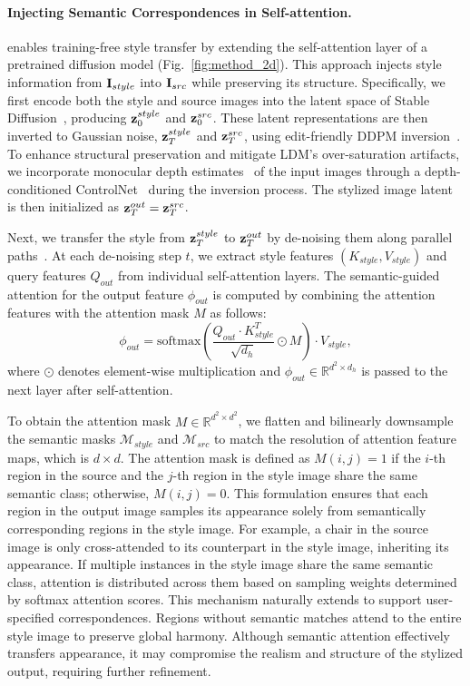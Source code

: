\paragraph{Injecting Semantic Correspondences in Self-attention.}
\ours enables training-free style transfer by extending the self-attention layer of a pretrained diffusion model (Fig.~\ref{fig:method_2d}). This approach injects style information from $\mathbf{I}_{style}$ into $\mathbf{I}_{src}$ while preserving its structure. Specifically, we first encode both the style and source images into the latent space of Stable Diffusion~\cite{rombach2022latentdiffusion}, producing $\mathbf{z}^{style}_0$ and $\mathbf{z}^{src}_0$. These latent representations are then inverted to Gaussian noise, $\mathbf{z}^{style}_T$ and $\mathbf{z}^{src}_T$, using edit-friendly DDPM inversion~\cite{huberman2024edit}.
To enhance structural preservation and mitigate LDM’s over-saturation artifacts, we incorporate monocular depth estimates~\cite{yang2024depth} of the input images through a depth-conditioned ControlNet~\cite{zhang2023adding} during the inversion process. The stylized image latent is then initialized as $\mathbf{z}^{out}_T = \mathbf{z}^{src}_T$.

Next, we transfer the style from $\mathbf{z}^{style}_T$ to $\mathbf{z}^{out}_T$ by de-noising them along parallel paths~\cite{alaluf2024cross}. At each de-noising step $t$, we extract style features $(K_{style}, V_{style})$ and query features $Q_{out}$ from individual self-attention layers. The semantic-guided attention for the output feature $\phi_{out}$ is computed by combining the attention features with the attention mask $M$ as follows:
\begin{equation} 
\phi_{out} = \text{softmax}\left(\frac{Q_{out} \cdot K_{style}^T}{\sqrt{d_h}} \odot M \right) \cdot V_{style}, 
\end{equation}
where $\odot$ denotes element-wise multiplication and $\phi_{out} \in \mathbb{R}^{d^2 \times d_h} $ is passed to the next layer after self-attention.


To obtain the attention mask $M \in \mathbb{R}^{d^2 \times d^2}$, we flatten and bilinearly downsample the semantic masks $\mathcal{M}_{style}$ and $\mathcal{M}_{src}$ to match the resolution of attention feature maps, which is $d\times d$. The attention mask is defined as $M(i,j)=1$ if the $i$-th region in the source and the $j$-th region in the style image share the same semantic class; otherwise, $M(i,j)=0$. 
This formulation ensures that each region in the output image samples its appearance solely from semantically corresponding regions in the style image.
For example, a chair in the source image is only cross-attended to its counterpart in the style image, inheriting its appearance.
If multiple instances in the style image share the same semantic class, attention is distributed across them based on sampling weights determined by softmax attention scores.
This mechanism naturally extends to support user-specified correspondences.
Regions without semantic matches attend to the entire style image to preserve global harmony.
Although semantic attention effectively transfers appearance, it may compromise the realism and structure of the stylized output, requiring further refinement.


